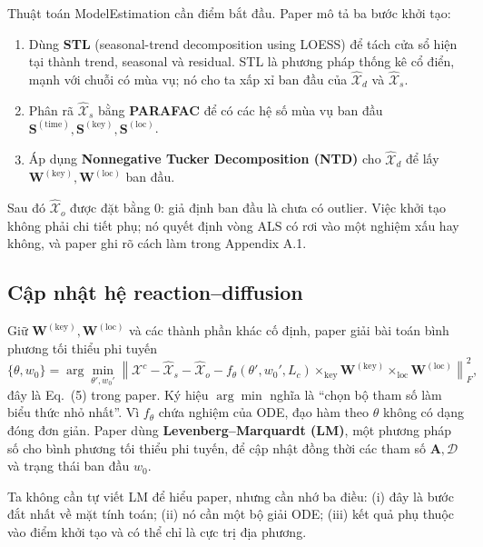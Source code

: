 Thuật toán ModelEstimation cần điểm bắt đầu. Paper mô tả ba bước khởi tạo:
\begin{enumerate}
  \item Dùng \textbf{STL} (seasonal-trend decomposition using LOESS) để tách cửa sổ hiện tại
        thành trend, seasonal và residual. STL là phương pháp thống kê cổ điển, mạnh với chuỗi
        có mùa vụ; nó cho ta xấp xỉ ban đầu của $\widehat{\mathcal{X}}_d$ và
        $\widehat{\mathcal{X}}_s$.
  \item Phân rã $\widehat{\mathcal{X}}_s$ bằng \textbf{PARAFAC} để có các hệ số mùa vụ ban đầu
        $\mathbf{S}^{(\mathrm{time})},\mathbf{S}^{(\mathrm{key})},\mathbf{S}^{(\mathrm{loc})}$.
  \item Áp dụng \textbf{Nonnegative Tucker Decomposition (NTD)} cho $\widehat{\mathcal{X}}_d$ để
        lấy $\mathbf{W}^{(\mathrm{key})},\mathbf{W}^{(\mathrm{loc})}$ ban đầu.
\end{enumerate}
Sau đó $\widehat{\mathcal{X}}_o$ được đặt bằng 0: giả định ban đầu là chưa có outlier. Việc khởi
tạo không phải chi tiết phụ; nó quyết định vòng ALS có rơi vào một nghiệm xấu hay không, và paper
ghi rõ cách làm trong Appendix A.1.

\subsection{Cập nhật hệ reaction--diffusion}

Giữ $\mathbf{W}^{(\mathrm{key})},\mathbf{W}^{(\mathrm{loc})}$ và các thành phần khác cố định,
paper giải bài toán bình phương tối thiểu phi tuyến
\begin{equation}
  \{\theta,w_0\}
  =\arg\min_{\theta',w_0'}
   \left\|
     \mathcal{X}^{c}-\widehat{\mathcal{X}}_s-\widehat{\mathcal{X}}_o
     -f_\theta(\theta',w_0',L_c)
       \times_{\mathrm{key}}\mathbf{W}^{(\mathrm{key})}
       \times_{\mathrm{loc}}\mathbf{W}^{(\mathrm{loc})}
   \right\|_F^2,
  \label{eq:lm-estimation}
\end{equation}
đây là Eq.~(5) trong paper. Ký hiệu $\arg\min$ nghĩa là ``chọn bộ tham số làm biểu thức nhỏ nhất''.
Vì $f_\theta$ chứa nghiệm của ODE, đạo hàm theo $\theta$ không có dạng đóng đơn giản. Paper dùng
\textbf{Levenberg--Marquardt (LM)}, một phương pháp số cho bình phương tối thiểu phi tuyến, để cập
nhật đồng thời các tham số $\mathbf{A},\mathcal{D}$ và trạng thái ban đầu $w_0$.

Ta không cần tự viết LM để hiểu paper, nhưng cần nhớ ba điều: (i) đây là bước đắt nhất về mặt
tính toán; (ii) nó cần một bộ giải ODE; (iii) kết quả phụ thuộc vào điểm khởi tạo và có thể chỉ là
cực trị địa phương.

